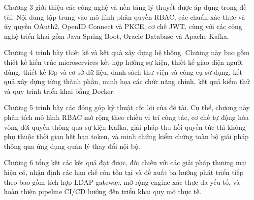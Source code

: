 \documentclass[../DoAn.tex]{subfiles}
\begin{document}
Chương 3 giới thiệu các công nghệ và nền tảng lý thuyết được áp dụng trong đề tài. Nội dung tập trung vào mô hình phân quyền RBAC, các chuẩn xác thực và ủy quyền OAuth2, OpenID Connect và PKCE, cơ chế JWT, cùng với các công nghệ triển khai gồm Java Spring Boot, Oracle Database và Apache Kafka.

Chương 4 trình bày thiết kế và kết quả xây dựng hệ thống. Chương này bao gồm thiết kế kiến trúc microservices kết hợp hướng sự kiện, thiết kế giao diện người dùng, thiết kế lớp và cơ sở dữ liệu, danh sách thư viện và công cụ sử dụng, kết quả xây dựng từng thành phần, minh họa các chức năng chính, kết quả kiểm thử và quy trình triển khai bằng Docker.

Chương 5 trình bày các đóng góp kỹ thuật cốt lõi của đề tài. Cụ thể, chương này phân tích mô hình RBAC mở rộng theo chiều vị trí công tác, cơ chế tự động hóa vòng đời quyền thông qua sự kiện Kafka, giải pháp thu hồi quyền tức thì không phụ thuộc thời gian hết hạn token, và minh chứng kiểm chứng toàn bộ giải pháp thông qua ứng dụng quản lý thay đổi nội bộ.

Chương 6 tổng kết các kết quả đạt được, đối chiếu với các giải pháp thương mại hiện có, nhận định các hạn chế còn tồn tại và đề xuất ba hướng phát triển tiếp theo bao gồm tích hợp LDAP gateway, mở rộng engine xác thực đa yếu tố, và hoàn thiện pipeline CI/CD hướng đến triển khai quy mô thực tế.
\end{document}
